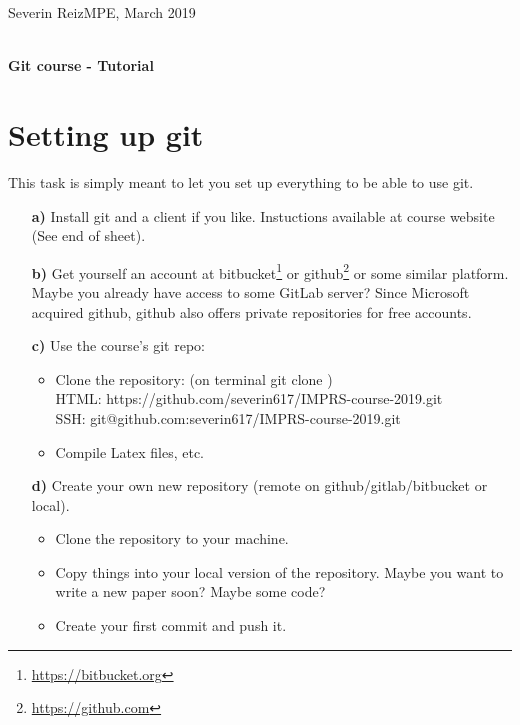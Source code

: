 \documentclass[11pt]{article}
\begin{document}
  {\normalsize  
Severin Reiz\hfill MPE, March 2019\\ 
    \mbox{}\\ [2ex] }

\thispagestyle{empty}
\begin{center}
    {\LARGE\sffamily\bfseries Git course - Tutorial}
\end{center}



\section*{Setting up git}
This task is simply meant to let you set up everything to be able to use git. 
\begin{itemize}
\item[\bf{a)}] Install git and a client if you like. Instuctions available at course website (See end of sheet).%
\item[\bf{b)}] Get yourself an account at bitbucket\footnote{\url{https://bitbucket.org}} or github\footnote{\url{https://github.com}} or some similar platform. Maybe you already have access to some GitLab server? Since Microsoft acquired github, github also offers private repositories for free accounts.
\item[\bf{c)}] Use the course's git repo:
\begin{itemize}
\item Clone the repository: (on terminal git clone )\\ 
HTML: https://github.com/severin617/IMPRS-course-2019.git \\
SSH: git@github.com:severin617/IMPRS-course-2019.git
\item Compile Latex files, etc.
\end{itemize}
\item[\bf{d)}] Create your own new repository (remote on github/gitlab/bitbucket or local).
\begin{itemize}
\item Clone the repository to your machine.
\item Copy things into your local version of the repository. Maybe you want to write a new paper soon? Maybe some code?
\item Create your first commit and push it.
\end{itemize}
\end{itemize}
\end{document}
